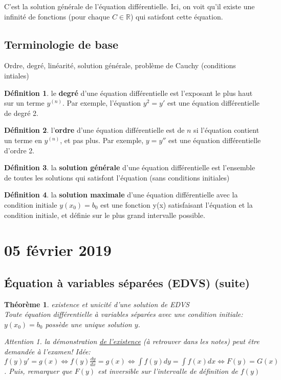 \documentclass{report}
\theoremstyle{plain}
\newtheorem{thm}{Théorème}[section]
\theoremstyle{definition}
\newtheorem{defn}{Définition}[section]
\theoremstyle{remark}
\newtheorem*{attention}{Attention}
\begin{document}
C'est la solution générale de l'équation différentielle. Ici, on voit qu'il existe une infinité de fonctions (pour chaque $C \in \mathbb{R}$) qui satisfont cette équation.

\subsection{Terminologie de base} %
Ordre, degré, linéarité, solution générale, problème de Cauchy (conditions intiales) \\
\begin{defn} le \textbf{degré} d'une équation différentielle est l'exposant le plus haut sur un terme $y^{(n)}$. Par exemple, l'équation $y^2 = y'$ est une équation différentielle de degré 2. 
\end{defn}
\begin{defn} l'\textbf{ordre} d'une équation différentielle est de $n$ si l'équation contient un terme en $y^{(n)}$, et pas plus. Par exemple, $y = y''$ est une équation différentielle d'ordre 2.
\end{defn}
\begin{defn} la \textbf{solution générale} d'une équation différentielle est l'ensemble de toutes les solutions qui satisfont l'équation (sans conditions initiales)
\end{defn}
\begin{defn} la \textbf{solution maximale} d'une équation différentielle avec la condition initiale $y(x_0) = b_0$ est une fonction y(x) satisfaisant l'équation et la condition initiale, et définie sur le plus grand intervalle possible.
\end{defn}

\section{05 février 2019}

\subsection{Équation à variables séparées (EDVS) (suite)}
\begin{thm} existence et unicité d'une solution de EDVS \\
Toute équation différentielle à variables séparées avec une condition initiale: $y(x_0) = b_0$ possède une unique solution $y$. \\
\begin{attention} la démonstration \underline{de l'existence} (à retrouver dans les notes) peut être demandée à l'examen! Idée: $f(y)y' = g(x) \iff f(y)\frac{dy}{dx} = g(x) \iff \int f(y)dy = \int f(x)dx \iff F(y) = G(x)$. Puis, remarquer que $F(y)$ est inversible sur l'intervalle de définition de $f(y)$
\end{attention}
\end{thm}
\end{document}
